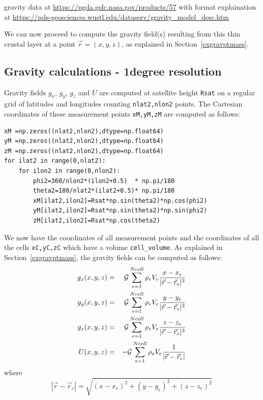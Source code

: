 gravity data at \url{https://pgda.gsfc.nasa.gov/products/57}
with format explaination at \url{https://pds-geosciences.wustl.edu/dataserv/gravity_model_desc.htm}

We can now proceed to compute the gravity field(s) 
resulting from this thin crustal layer at a point $\vec{r}=(x,y,z)$, as 
explained in Section~\ref{exgravptmass}.

\subsection*{Gravity calculations - 1degree resolution}

Gravity fields $g_x$, $g_y$, $g_z$ and $U$ are computed at satellite height \lstinline{Rsat}
on a regular grid of latitudes and longitudes counting \lstinline{nlat2,nlon2} points. 
The Cartesian coordinates of these measurement points \lstinline{xM,yM,zM} 
are computed as follows:
\begin{lstlisting}
xM =np.zeros((nlat2,nlon2),dtype=np.float64)
yM =np.zeros((nlat2,nlon2),dtype=np.float64)
zM =np.zeros((nlat2,nlon2),dtype=np.float64)
for ilat2 in range(0,nlat2):
    for ilon2 in range(0,nlon2): 
        phi2=360/nlon2*(ilon2+0.5)  * np.pi/180
        theta2=180/nlat2*(ilat2+0.5)* np.pi/180
        xM[ilat2,ilon2]=Rsat*np.sin(theta2)*np.cos(phi2)
        yM[ilat2,ilon2]=Rsat*np.sin(theta2)*np.sin(phi2)
        zM[ilat2,ilon2]=Rsat*np.cos(theta2)
\end{lstlisting}
We now have the coordinates of all measurement points and the coordinates of all the 
cells \lstinline{xC,yC,zC} which have a volume \lstinline{cell_volume}.
As explained in Section~\ref{exgravptmass}, the gravity fields can be computed as 
follows:
\begin{eqnarray}
g_x(x,y,z) &=& {\cal G}  \sum_{e=1}^{Ncell} \rho_e V_e  \frac{x-x_e}{|\vec{r}-\vec{r}_e|^3} \label{eqq:gravdiscr1}\\
g_y(x,y,z) &=& {\cal G}  \sum_{e=1}^{Ncell} \rho_e V_e  \frac{y-y_e}{|\vec{r}-\vec{r}_e|^3} \label{eqq:gravdiscr2}\\
g_z(x,y,z) &=& {\cal G}  \sum_{e=1}^{Ncell} \rho_e V_e  \frac{z-z_e}{|\vec{r}-\vec{r}_e|^3} \label{eqq:gravdiscr3}\\
U(x,y,z)   &=& -{\cal G} \sum_{e=1}^{Ncell} \rho_e V_e  \frac{1}{|\vec{r}-\vec{r}_e|}       \label{eqq:gravdiscr4}
\end{eqnarray}
where 
\[
|\vec{r}-\vec{r}_e|=\sqrt{ (x-x_e)^2+(y-y_e)^2+(z-z_e)^2   }
\]
